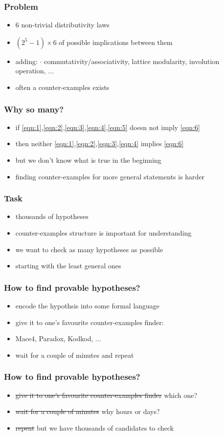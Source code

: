 \documentclass{beamer}
\begin{document}
\begin{frame}
\frametitle{Problem}
\begin{itemize}
\item 6 non-trivial distributivity laws
\item $(2^5 - 1) \times 6$ of possible implications between them
\item adding: $\cdot$ commutativity/associativity, lattice modularity, involution operation, ...
\item often a counter-examples exists
\end{itemize}
\end{frame}
\begin{frame}
\frametitle{Why so many?}
\begin{itemize}
\item if \ref{eqn:1},\ref{eqn:2},\ref{eqn:3},\ref{eqn:4},\ref{eqn:5} doesn not imply \ref{eqn:6}
\item then neither \ref{eqn:1},\ref{eqn:2},\ref{eqn:3},\ref{eqn:4} implies \ref{eqn:6}
\item but we don't know what is true in the beginning
\item finding counter-examples for more general statements is harder  
\end{itemize}
\end{frame}
\begin{frame}
\frametitle{Task}
\begin{itemize}
\item thousands of hypotheses
\item counter-examples structure is important for understanding
\item we want to check as many hypotheses as possible
\item starting with the least general ones  
\end{itemize}
\end{frame}
\begin{frame}
\frametitle{How to find provable hypotheses?}
\begin{itemize}
\item encode the hypothsis into some formal language
\item give it to one's favourite counter-examples finder:
\item Mace4, Paradox, Kodkod, ...  
\item wait for a couple of minutes and repeat
\end{itemize}
\end{frame}
\begin{frame}
\frametitle{How to find provable hypotheses?}
\begin{itemize}
\item \sout{give it to one's favourite counter-examples finder} which one?
\item \sout{wait for a couple of minutes} why hours or days?
\item \sout{repeat} but we have thousands of candidates to check
\end{itemize}
\end{frame}
\end{document}
